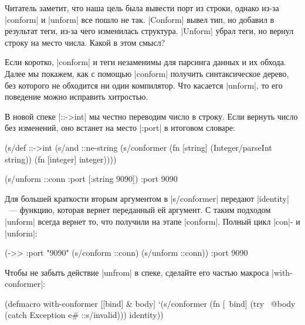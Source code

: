 Читатель заметит, что наша цель была вывести порт из строки, однако из-за
\spverb|conform| и \spverb|unform| все пошло не так. \spverb|Conform| вывел тип,
но добавил в результат теги, из-за чего изменилась структура. \spverb|Unform|
убрал теги, но вернул строку на место числа. Какой в этом смысл?

Если коротко, \spverb|conform| и теги незаменимы для парсинга данных и их
обхода. Далее мы покажем, как с помощью \spverb|conform| получить синтаксическое
дерево, без которого не обходится ни один компилятор. Что касается
\spverb|unform|, то его поведение можно исправить хитростью.

В новой спеке \spverb|::->int| мы честно переводим число в строку. Если вернуть
число без изменений, оно встанет на место \spverb|:port| в итоговом словаре:

\begin{english}
  \begin{clojure}
(s/def ::->int
  (s/and
   ::ne-string
   (s/conformer
    (fn [string]
      (Integer/parseInt string))
    (fn [integer]
      integer))))

(s/unform ::conn {:port [:string 9090]})
{:port 9090}
  \end{clojure}
\end{english}

Для большей краткости вторым аргументом в \spverb|s/conformer| передают
\spverb|identity|~--- функцию, которая вернет переданный ей аргумент. С таким
подходом \spverb|unform| всегда вернет то, что получили на этапе
\spverb|conform|. Полный цикл \spverb|con|- и \spverb|unform|:

\begin{english}
  \begin{clojure}
(->> {:port "9090"}
     (s/conform ::conn)
     (s/unform ::conn))
{:port 9090}
  \end{clojure}
\end{english}

Чтобы не забыть действие \spverb|unfrom| в спеке, сделайте его частью макроса
\spverb|with-conformer|:

\begin{english}
  \begin{clojure}
(defmacro with-conformer
  [[bind] & body]
  `(s/conformer
    (fn [~bind]
      (try
        ~@body
        (catch Exception e#
          ::s/invalid)))
    identity))
  \end{clojure}
\end{english}

